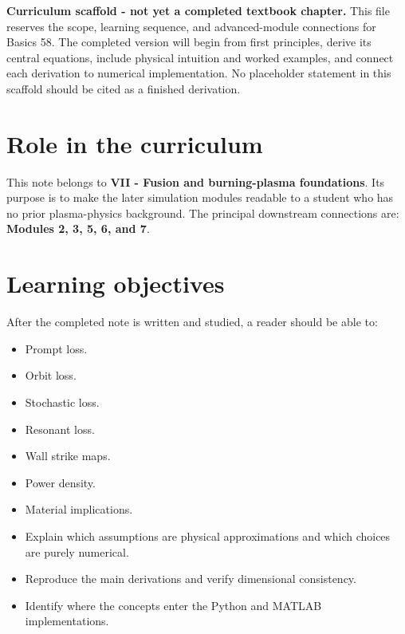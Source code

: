 \documentclass[11pt]{article}
\begin{document}

\begin{overviewbox}
\textbf{Curriculum scaffold - not yet a completed textbook chapter.} This file reserves the scope, learning sequence, and advanced-module connections for Basics 58. The completed version will begin from first principles, derive its central equations, include physical intuition and worked examples, and connect each derivation to numerical implementation. No placeholder statement in this scaffold should be cited as a finished derivation.
\end{overviewbox}

\ProjectTOC

\section{Role in the curriculum}
This note belongs to \textbf{VII - Fusion and burning-plasma foundations}. Its purpose is to make the later simulation modules readable to a student who has no prior plasma-physics background. The principal downstream connections are: \textbf{Modules 2, 3, 5, 6, and 7}.

\section{Learning objectives}
After the completed note is written and studied, a reader should be able to:
\begin{itemize}[leftmargin=1.6em]
\item Prompt loss.
\item Orbit loss.
\item Stochastic loss.
\item Resonant loss.
\item Wall strike maps.
\item Power density.
\item Material implications.
\item Explain which assumptions are physical approximations and which choices are purely numerical.
\item Reproduce the main derivations and verify dimensional consistency.
\item Identify where the concepts enter the Python and MATLAB implementations.
\end{itemize}
\end{document}
